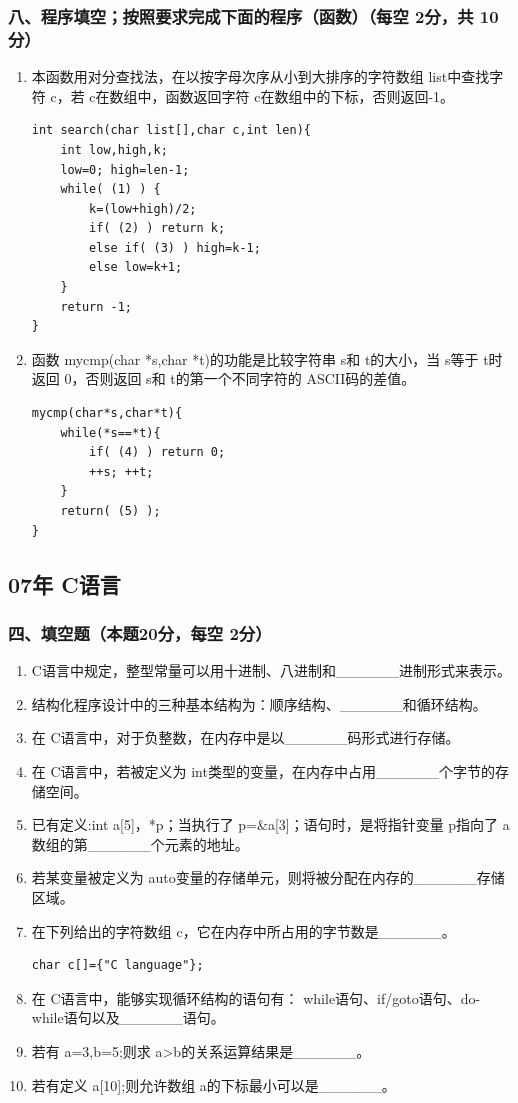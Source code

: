 \documentclass[12pt,a4paper]{article}
\begin{document}
\subsubsection*{八、程序填空；按照要求完成下面的程序（函数）（每空 2分，共 10分）}
\begin{enumerate}
    \item 本函数用对分查找法，在以按字母次序从小到大排序的字符数组 list中查找字符 c，若 c在数组中，函数返回字符 c在数组中的下标，否则返回-1。
    \begin{verbatim}
int search(char list[],char c,int len){
    int low,high,k;
    low=0; high=len-1;
    while( (1) ) {
        k=(low+high)/2;
        if( (2) ) return k;
        else if( (3) ) high=k-1;
        else low=k+1;
    }
    return -1;
}
    \end{verbatim}
    
    \item 函数 mycmp(char *s,char *t)的功能是比较字符串 s和 t的大小，当 s等于 t时返回 0，否则返回 s和 t的第一个不同字符的 ASCII码的差值。
    \begin{verbatim}
mycmp(char*s,char*t){
    while(*s==*t){
        if( (4) ) return 0;
        ++s; ++t;
    }
    return( (5) );
}
    \end{verbatim}
\end{enumerate}

\subsection*{07年 C语言}
\subsubsection*{四、填空题（本题20分，每空 2分）}
\begin{enumerate}
    \item C语言中规定，整型常量可以用十进制、八进制和\_\_\_\_\_\_进制形式来表示。
    \item 结构化程序设计中的三种基本结构为：顺序结构、\_\_\_\_\_\_和循环结构。
    \item 在 C语言中，对于负整数，在内存中是以\_\_\_\_\_\_码形式进行存储。
    \item 在 C语言中，若被定义为 int类型的变量，在内存中占用\_\_\_\_\_\_个字节的存储空间。
    \item 已有定义:int a[5]，*p；当执行了 p=\&a[3]；语句时，是将指针变量 p指向了 a数组的第\_\_\_\_\_\_个元素的地址。
    \item 若某变量被定义为 auto变量的存储单元，则将被分配在内存的\_\_\_\_\_\_存储区域。
    \item 在下列给出的字符数组 c，它在内存中所占用的字节数是\_\_\_\_\_\_。
    \begin{verbatim}
char c[]={"C language"};
    \end{verbatim}
    \item 在 C语言中，能够实现循环结构的语句有： while语句、if/goto语句、do-while语句以及\_\_\_\_\_\_语句。
    \item 若有 a=3,b=5;则求 a>b的关系运算结果是\_\_\_\_\_\_。
    \item 若有定义 a[10];则允许数组 a的下标最小可以是\_\_\_\_\_\_。
\end{enumerate}
\end{document}
